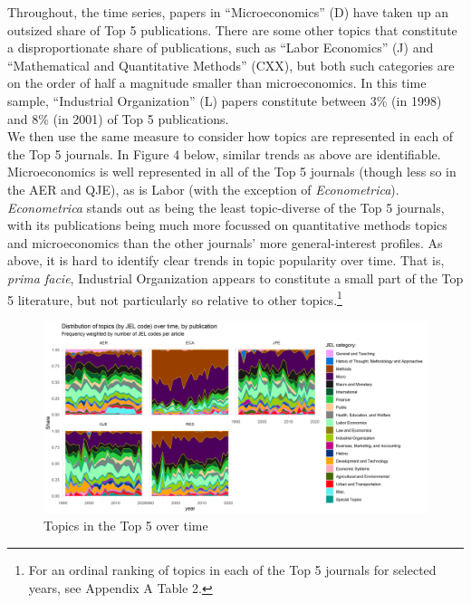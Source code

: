 \documentclass[11pt, letterpaper, twoside]{article}
\begin{document}
Throughout, the time series, papers in ``Microeconomics'' (D) have taken up an outsized share of Top 5 publications. There are some other topics that constitute a disproportionate share of publications, such as ``Labor Economics'' (J) and ``Mathematical and Quantitative Methods'' (CXX), but both such categories are on the order of half a magnitude smaller than microeconomics. In this time sample, ``Industrial Organization'' (L) papers constitute between 3\% (in 1998) and 8\% (in 2001) of Top 5 publications.\\

We then use the same measure to consider how topics are represented in each of the Top 5 journals. In Figure 4 below, similar trends as above are identifiable. Microeconomics is well represented in all of the Top 5 journals (though less so in the AER and QJE), as is Labor (with the exception of \textit{Econometrica}). \textit{Econometrica} stands out as being the least topic-diverse of the Top 5 journals, with its publications being much more focussed on quantitative methods topics and microeconomics than the other journals' more general-interest profiles. As above, it is hard to identify clear trends in topic popularity over time. That is, \textit{prima facie}, Industrial Organization appears to constitute a small part of the Top 5 literature, but not particularly so relative to other topics.\footnote{For an ordinal ranking of topics in each of the Top 5 journals for selected years, see Appendix A Table 2.}


\begin{figure}[h]
    \centering
    \includegraphics[width=\textwidth]{jel_weighted_normalized_by_journal.png}
    \caption{Topics in the Top 5 over time}
\end{figure}
\end{document}
